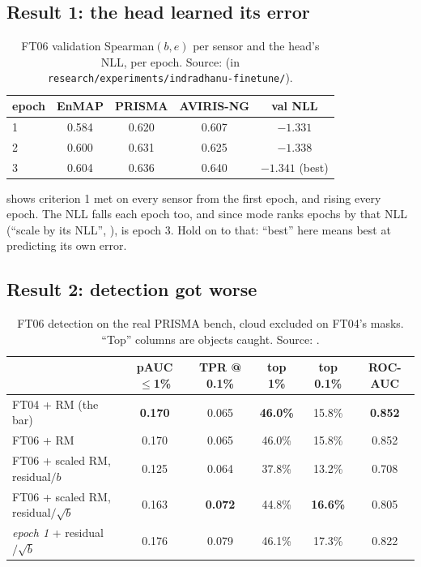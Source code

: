 \subsection{Result 1: the head learned its error}

\begin{table}[htbp]
\centering
\begin{tabular}{lcccc}
\toprule
epoch & EnMAP & PRISMA & AVIRIS-NG & val NLL\\
\midrule
1 & 0.584 & 0.620 & 0.607 & $-1.331$\\
2 & 0.600 & 0.631 & 0.625 & $-1.338$\\
3 & 0.604 & 0.636 & 0.640 & $-1.341$ (best)\\
\bottomrule
\end{tabular}
\caption{FT06 validation Spearman$(b,e)$ per sensor and the head's NLL, per epoch. Source:
 (in \texttt{research/experiments/indradhanu-finetune/}).}
\label{tab:uncertainty:spearman}
\end{table}

 shows criterion 1 met on every sensor from the first epoch, and rising every
epoch. The NLL falls each epoch too, and since mode  ranks epochs by that NLL (``scale by its
NLL'', ),  is epoch 3. Hold on to that: ``best'' here means best at
predicting its own error.

\subsection{Result 2: detection got worse}

\begin{table}[htbp]
\centering\small
\begin{tabular}{lccccc}
\toprule
 & pAUC $\le$1\% & TPR @ 0.1\% & top 1\% & top 0.1\% & ROC-AUC\\
\midrule
FT04 + RM (the bar) & \textbf{0.170} & 0.065 & \textbf{46.0\%} & 15.8\% & \textbf{0.852}\\
FT06 + RM & 0.170 & 0.065 & 46.0\% & 15.8\% & 0.852\\
FT06 + scaled RM, residual$/b$ & 0.125 & 0.064 & 37.8\% & 13.2\% & 0.708\\
FT06 + scaled RM, residual$/\sqrt b$ & 0.163 & \textbf{0.072} & 44.8\% & \textbf{16.6\%} & 0.805\\
\emph{epoch 1} + residual$/\sqrt b$ & 0.176 & 0.079 & 46.1\% & 17.3\% & 0.822\\
\bottomrule
\end{tabular}
\caption{FT06 detection on the real PRISMA bench, cloud excluded on FT04's masks. ``Top'' columns are objects
caught. Source: .}
\label{tab:uncertainty:detect}
\end{table}

